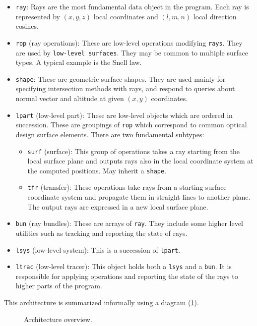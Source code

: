 \begin{itemize}
\item \lstinline{ray}: Rays are the most fundamental data object in the
program.  Each ray is represented by $(x, y, z)$ local coordinates and $(l, m,
n)$ local direction cosines.
\item \lstinline{rop} (ray operations): These are low-level operations
modifying \lstinline{rays}.  They are used by \lstinline{low-level surfaces}.
They may be common to multiple surface types. A typical example is the
Snell law.
\item \lstinline{shape}: These are geometric surface shapes. They are used
mainly for specifying intersection methods with rays, and respond to queries
about normal vector and altitude at given $(x, y)$ coordinates.
\item \lstinline{lpart} (low-level part): These are low-level objects which
are ordered in succession. These are groupings of \lstinline{rop}
which correspond to common optical design surface elements. There are two
fundamental subtypes:
\begin{itemize}
\item \lstinline{surf} (surface): This group of operations takes a ray starting
from the local surface plane and outputs rays also in the local coordinate
system at the computed positions. May inherit a \lstinline{shape}.
\item \lstinline{tfr} (transfer): These operations take rays from a starting
surface coordinate system and propagate them in straight lines to another
plane. The output rays are expressed in a new local surface plane.
\end{itemize}
\item \lstinline{bun} (ray bundles): These are arrays of \lstinline{ray}. They
include some higher level utilities such as tracking and reporting the state of
rays.
\item \lstinline{lsys} (low-level system): This is a succession of
\lstinline{lpart}.
\item \lstinline{ltrac} (low-level tracer): This object holds both a
\lstinline{lsys} and a \lstinline{bun}. It is responsible for applying
operations and reporting the state of the rays to higher parts of the program.
\end{itemize}

This architecture is summarized informally using a diagram
(\cref{fig:arch-overview}).

\begin{figure} 

\caption{\label{fig:arch-overview} Architecture overview.}
\end{figure}

